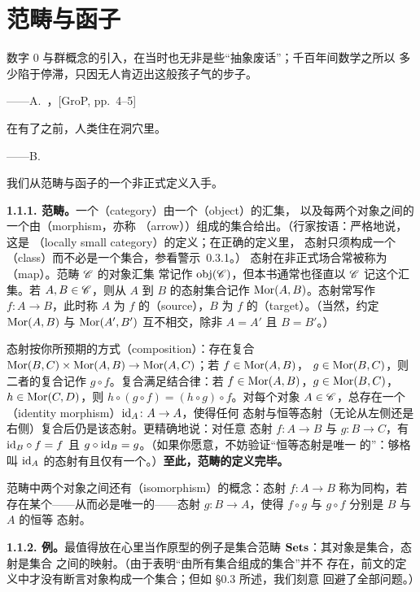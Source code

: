 \section{范畴与函子}

\epigraph
  {数字 $0$ 与群概念的引入，在当时也无非是些“抽象废话”；千百年间数学之所以
   多少陷于停滞，只因无人肯迈出这般孩子气的步子。}
  {——A.~\trGrothendieck，[GroP, pp.~4--5]}
\epigraph
  {在有了\trFunctoriality{}之前，人类住在洞穴里。}
  {——B.~\trConrad}

我们从范畴与函子的一个非正式定义入手。

\textbf{1.1.1. 范畴。}\quad 一个\textbf{\trCategory}（category）由一个\textbf{\trObject}（object）的汇集，
以及每两个对象之间的一个由\textbf{\trMorphism}（morphism，亦称
\textbf{\trArrow}（arrow））组成的集合给出。（行家按语：严格地说，这是%
\trLocallySmallCategory{}（locally small category）的定义；在正确的定义里，
态射只须构成一个\trClass{}（class）而不必是一个集合，参看警示~0.3.1。）
态射在非正式场合常被称为\textbf{\trMap}（map）。范畴 $\mathscr{C}$ 的对象汇集
常记作 $\operatorname{obj}(\mathscr{C})$，但本书通常也径直以 $\mathscr{C}$ 记这个汇集。若
$A,B\in\mathscr{C}$，则从 $A$ 到 $B$ 的态射集合记作 $\operatorname{Mor}(A,B)$。态射常写作
$f\colon A\to B$，此时称 $A$ 为 $f$ 的\textbf{\trSource}（source），$B$ 为
$f$ 的\textbf{\trTarget}（target）。（当然，约定 $\operatorname{Mor}(A,B)$ 与
$\operatorname{Mor}(A',B')$ 互不相交，除非 $A=A'$ 且 $B=B'$。）

态射按你所预期的方式\textbf{\trComposition}（composition）：存在复合
$\operatorname{Mor}(B,C)\times\operatorname{Mor}(A,B)\to\operatorname{Mor}(A,C)$；若 $f\in\operatorname{Mor}(A,B)$，
$g\in\operatorname{Mor}(B,C)$，则二者的复合记作 $g\circ f$。复合满足结合律：若
$f\in\operatorname{Mor}(A,B)$，$g\in\operatorname{Mor}(B,C)$，$h\in\operatorname{Mor}(C,D)$，则
$h\circ(g\circ f)=(h\circ g)\circ f$。对每个对象 $A\in\mathscr{C}$，总存在一个
\textbf{\trIdMorphism}（identity morphism）$\mathrm{id}_A\colon A\to A$，使得任何
态射与恒等态射（无论从左侧还是右侧）复合后仍是该态射。更精确地说：对任意
态射 $f\colon A\to B$ 与 $g\colon B\to C$，有
$\mathrm{id}_B\circ f=f$ 且 $g\circ\mathrm{id}_B=g$。（如果你愿意，不妨验证“恒等态射是唯一
的”：够格叫 $\mathrm{id}_A$ 的态射有且仅有一个。）\textbf{至此，范畴的定义完毕。}

范畴中两个对象之间还有\textbf{\trIsomorphism}（isomorphism）的概念：态射
$f\colon A\to B$ 称为同构，若存在某个——从而必是唯一的——态射
$g\colon B\to A$，使得 $f\circ g$ 与 $g\circ f$ 分别是 $B$ 与 $A$ 的恒等
态射。

\textbf{1.1.2. 例。}\quad 最值得放在心里当作原型的例子是集合范畴 $\mathbf{Sets}$：其对象是集合，态射是集合
之间的映射。（由于\trRussell\trParadox{}表明“由所有集合组成的集合”并不
存在，前文的定义中才没有断言对象构成一个集合；但如 \S0.3 所述，我们刻意
回避了全部\trSetTheoretic{}问题。）

